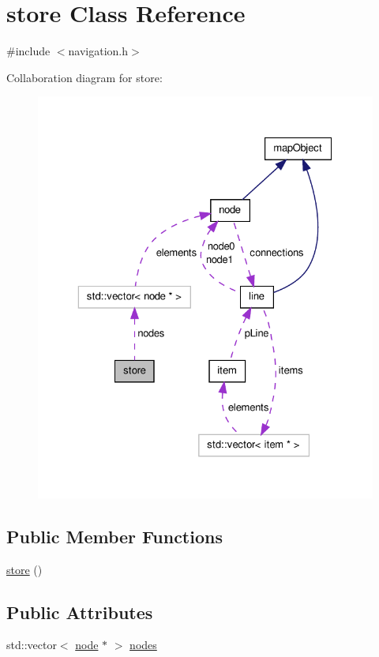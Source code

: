 \hypertarget{classstore}{\section{store \-Class \-Reference}
\label{classstore}
}


{\ttfamily \#include $<$navigation.\-h$>$}



\-Collaboration diagram for store\-:\nopagebreak
\begin{figure}[H]
\begin{center}
\leavevmode
\includegraphics[width=325pt]{classstore__coll__graph}
\end{center}
\end{figure}
\subsection*{\-Public \-Member \-Functions}
\begin{DoxyCompactItemize}
\item 
\hyperlink{classstore_ae9bf3b1389976a88072098a95be397ab}{store} ()
\end{DoxyCompactItemize}
\subsection*{\-Public \-Attributes}
\begin{DoxyCompactItemize}
\item 
std\-::vector$<$ \hyperlink{classnode}{node} $\ast$ $>$ \hyperlink{classstore_a38bffc57e2b230602490820c3ddc4a73}{nodes}
\end{DoxyCompactItemize}
